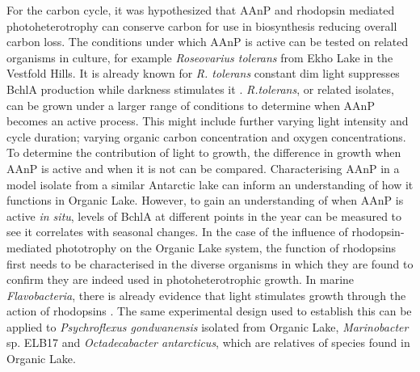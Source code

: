 For the carbon cycle, it was hypothesized that \ac{AAnP} and rhodopsin mediated photoheterotrophy can conserve carbon for use in biosynthesis  reducing overall carbon loss.
The conditions under which \ac{AAnP} is active can be tested on related organisms in culture, for example \emph{Roseovarius tolerans} from Ekho Lake in the Vestfold Hills. 
It is already known for \emph{R. tolerans} constant dim light suppresses \ac{BchlA} production while darkness stimulates it \cite{Labrenz1999}.
\emph{R.tolerans}, or related isolates, can be grown under a larger range of conditions to determine when \ac{AAnP} becomes an active process.
This might include further varying light intensity and cycle duration; varying organic carbon concentration and oxygen concentrations.
To determine the contribution of light to growth, the difference in growth when \ac{AAnP} is active and when it is not can be compared.
Characterising \ac{AAnP} in a model isolate from a similar Antarctic lake can inform an understanding of how it functions in Organic Lake.
However, to gain an understanding of when \ac{AAnP} is active \emph{in situ}, levels of \ac{BchlA} at different points in the year can be measured to see it correlates with seasonal changes.
In the case of the influence of rhodopsin-mediated phototrophy on the Organic Lake system, the function of rhodopsins first needs to be characterised in the diverse organisms in which they are found to confirm they are indeed used in photoheterotrophic growth.
In marine \emph{Flavobacteria}, there is already evidence that light stimulates growth through the action of rhodopsins \cite{Gomez-Consarnau2007}.
The same experimental design used to establish this can be applied to \emph{Psychroflexus gondwanensis} isolated from Organic Lake, \emph{Marinobacter} sp. ELB17 and \emph{Octadecabacter antarcticus}, which are relatives of species found in Organic Lake.

